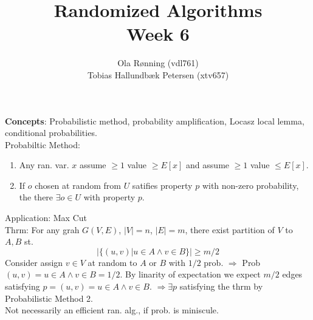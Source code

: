 \documentclass[a4paper]{article}
\author{Ola Rønning (vdl761)\\Tobias Hallundbæk Petersen (xtv657)}
\title{Randomized Algorithms \\ Week 6}
\begin{document}
\textbf{Concepts}: Probabilistic method, probability amplification, Locasz local lemma, conditional probabilities.\\
Probabiltic Method:
\begin{enumerate}
\item Any ran. var. \(x\) assume \(\geq 1\) value \(\geq E[x]\) and assume \(\geq 1\) value \(\leq E[x]\).
\item If \(o\) chosen at random from \(U\) satifies property \(p\) with non-zero probability, the there \(\exists o \in U\) with property \(p\).
\end{enumerate}
Application: Max Cut\\
Thrm: For any grah \(G(V,E)\), \(|V|=n\), \(|E|=m\), there exist partition of \(V\) to \(A,B\) st.
\[|\{(u,v)|u\in A \wedge v\in B\}| \geq m/2\]
Consider assign \(v\in V\) at random to \(A\) or \(B\) with \(1/2\) prob. \(\Rightarrow\) Prob \((u,v)=u\in A \wedge v\in B = 1/2\). By linarity of expectation we expect \(m/2\) edges satisfying \(p=(u,v)=u\in A \wedge v\in B\). \(\Rightarrow \exists p\) satisfying the thrm by Probabilistic Method 2.\\
Not necessarily an efficient ran. alg., if prob. is miniscule.
\end{document}
